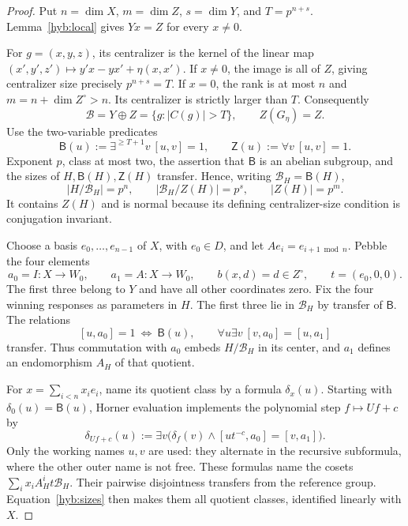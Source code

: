 \documentclass[11pt]{article}
\theoremstyle{definition}
\theoremstyle{remark}
\numberwithin{equation}{section}
\begin{document}
\begin{proof}
Put \(n=\dim X\), \(m=\dim Z\),
\(s=\dim Y\), and \(T=p^{n+s}\).
Lemma~\ref{hyb:local} gives
\(Yx=Z\) for every \(x\neq0\).

For \(g=(x,y,z)\), its centralizer is the kernel of the linear map
\((x',y',z')\mapsto y'x-yx'+\eta(x,x')\). If \(x\ne0\),
the image is all of \(Z\), giving centralizer size precisely
\(p^{n+s}=T\). If \(x=0\), the rank is at most \(n\) and
\(m=n+\dim Z^\circ>n\). Its centralizer is strictly larger than \(T\).
Consequently
\[
 \mathcal B=Y\oplus Z=\{g:|C(g)|>T\},\qquad Z(G_\eta)=Z.
\]
Use the two-variable predicates
\[
 \mathsf B(u):=\exists^{\geq T+1}v\ [u,v]=1,
 \qquad \mathsf Z(u):=\forall v\ [u,v]=1.
\]
Exponent \(p\), class at most two, the assertion that \(\mathsf B\)
is an abelian subgroup, and the sizes of \(H,\mathsf B(H),\mathsf Z(H)\)
transfer.  Hence, writing \(\mathcal B_H=\mathsf B(H)\),
\begin{equation}
 |H/\mathcal B_H|=p^n,\qquad
 |\mathcal B_H/Z(H)|=p^s,\qquad |Z(H)|=p^m.
 \label{hyb:sizes}
\end{equation}
It contains \(Z(H)\) and is normal because its defining
centralizer-size condition is conjugation invariant.

Choose a basis \(e_0,\ldots,e_{n-1}\) of \(X\), with
\(e_0\in D\), and let \(Ae_i=e_{i+1\bmod n}\).
Pebble the four elements
\[
 a_0=I:X\to W_0,\qquad
 a_1=A:X\to W_0,\qquad
 b(x,d)=d\in Z^\circ,\qquad t=(e_0,0,0).
\]
The first three belong to \(Y\) and have all other
coordinates zero.  Fix the four winning responses as parameters in
\(H\). The first three lie in \(\mathcal B_H\) by transfer of
\(\mathsf B\).
The relations
\[
 [u,a_0]=1\ \Longleftrightarrow\ \mathsf B(u),
 \qquad \forall u\exists v\ [v,a_0]=[u,a_1]
\]
transfer.  Thus commutation with \(a_0\) embeds \(H/\mathcal B_H\)
in its center, and \(a_1\) defines an endomorphism \(A_H\) of that
quotient.

For \(x=\sum_{i<n}x_i e_i\), name its quotient class by a formula
\(\delta_x(u)\).  Starting with \(\delta_0(u)=\mathsf B(u)\),
Horner evaluation implements the polynomial step \(f\mapsto Uf+c\) by
\begin{equation}
 \delta_{Uf+c}(u):=
 \exists v\bigl(\delta_f(v)\land
       [ut^{-c},a_0]=[v,a_1]\bigr).
 \label{hyb:horner}
\end{equation}
Only the working names \(u,v\) are used: they alternate in the
recursive subformula, where the other outer name is not free.
These formulas name the cosets \(\sum_i x_iA_H^it\mathcal B_H\).
Their pairwise disjointness transfers from the reference group.
Equation~\eqref{hyb:sizes} then makes them all quotient classes,
identified linearly with \(X\).


\end{proof}
\end{document}
